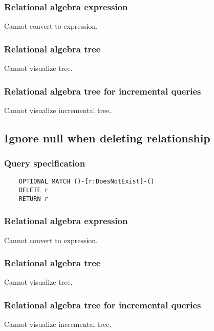 	\subsubsection*{Relational algebra expression}

	Cannot convert to expression.

	\subsubsection*{Relational algebra tree}

	Cannot visualize tree.

	\subsubsection*{Relational algebra tree for incremental queries}

	Cannot visualize incremental tree.
	\subsection{Ignore null when deleting relationship}

	\subsubsection*{Query specification}

	\begin{lstlisting}
	OPTIONAL MATCH ()-[r:DoesNotExist]-()
	DELETE r
	RETURN r
	\end{lstlisting}


	\subsubsection*{Relational algebra expression}

	Cannot convert to expression.

	\subsubsection*{Relational algebra tree}

	Cannot visualize tree.

	\subsubsection*{Relational algebra tree for incremental queries}

	Cannot visualize incremental tree.

